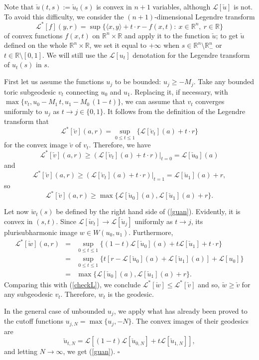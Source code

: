 \documentclass[12pt]{article}
\newcommand{\beq}{\begin{equation}}
\newcommand{\eeq}{\end{equation}}
\numberwithin{equation}{section}
\newenvironment{proof}{\medbreak\noindent{\it Proof.}\rm}{\hfill$\square$\rm}
\newcommand{\R}{{\mathbb R}}
\newcommand{\Rn}{{\mathbb R}^n}
\newcommand{\Rnm}{{\mathbb R}_-^n}
\newcommand{\cL}{{\mathcal  L}}
\begin{document}
\begin{proof}
Note that $\check u(t,s):=\check u_t(s)$ is convex in $n+1$ variables, although $\cL[\check u]$ is not. To avoid this difficulty, we consider the $(n+1)$-dimensional Legendre transform
$$\cL^*[f](y,r)=\sup\{\langle x,y\rangle + t\cdot r -f(x,t):\: x\in\Rn,\ r\in\R\}$$
of convex functions $f(x,t)$ on $\Rn\times\R$ and apply it to the function $\check u$; to get $\check u$ defined on the whole $\Rn\times\R$, we set it equal to $+\infty$ when $s\in\Rn\setminus \Rnm$ or $t\in\R\setminus [0,1]$. We will still use the $\cL[u_t]$ denotation for the Legendre transform of $u_t(s)$ in $s$.

First let us assume the functions $u_j$ to be bounded: $u_j\ge -M_j$.
Take any bounded toric subgeodesic $v_t$ connecting $u_0$ and $u_1$. Replacing it, if necessary, with $\max\{v_t, u_0-M_1\,t,u_1-M_0\,(1-t)\}$, we can assume that $v_t$ converges uniformly to $ u_j$ as $t\to j\in\{0,1\}$.
It follows from the definition of the Legendre transform that
$$\cL^*[\check v](a,r)=\sup_{0\le t\le 1}\{\cL[\check v_t](a)+t\cdot r\}$$
for the convex image $\check v$ of $v_t$. Therefore, we have
$$\cL^*[\check v](a,r)\ge (\cL[\check v_t](a)+t\cdot r)|_{t=0}=\cL[\check u_0](a)$$
and
$$\cL^*[\check v](a,r)\ge (\cL[\check v_t](a)+t\cdot r)|_{t=1}=\cL[\check u_1](a)+r,$$
so
\beq\label{checkL}\cL^*[\check v](a,r)\ge \max\{\cL[\check u_0](a), \cL[\check u_1](a)+r\}.\eeq

Let now $\check w_t(s)$ be defined by the right hand side of (\ref{guan}). Evidently, it is convex in $(s,t)$. Since $\cL[\check w_t]\to \cL[\check u_j]$ uniformly as $t\to j$, its plurisubharmonic image $w\in W(u_0,u_1)$. Furthermore,
\begin{eqnarray*}\cL^*[\check w](a,r) &=& \sup_{0\le t\le 1}\{(1-t)\cL[\check u_0](a)+t\cL[\check u_1]+t\cdot r\}\\
&=& \sup_{0\le t\le 1}\{t\left[r-\cL[\check u_0](a)+\cL[\check u_1](a)\right]+\cL[u_0]\}\\
&=& \max \{\cL[\check u_0](a), \cL[\check u_1](a)+r\}.
\end{eqnarray*}
Comparing this with (\ref{checkL}), we conclude $\cL^*[\check w]\le \cL^*[\check v]$ and so, $\check w\ge \check v$ for any subgeodesic $v_t$. Therefore, $w_t$ is the geodesic.

In the general case of unbounded $u_j$, we apply what has already been proved to the cutoff functions $u_{j,N}=\max\{u_j,-N\}$. The convex images of their geodesics are $$\check u_{t,N} =\cL\left[ (1-t)\cL[\check u_{0,N}] + t\cL[\check u_{1,N}]\right],$$
and letting $N\to\infty$, we get (\ref{guan}).
\end{proof}
\end{document}

